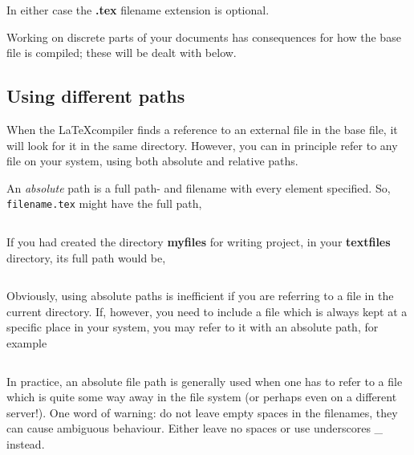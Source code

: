 In either case the \textbf{.tex} filename extension is optional.

Working on discrete parts of your documents has consequences for how the base file is compiled; these will be dealt with below.

\subsection{Using different paths}
When the \LaTeX{}compiler finds a reference to an external file in the base file, it will look for it in the same directory. However, you can in principle refer to any file on your system, using both absolute and relative paths.

An \textit{absolute} path is a full path- and filename with every element specified. So, \lstinline[language={[LaTeX]TeX}]|filename.tex| might have the full path,

\begin{lstlisting}[language={[LaTeX]TeX}]

\end{lstlisting}

If you had created the directory \textbf{myfiles} for writing project, in your \textbf{textfiles} directory, its full path would be,

\begin{lstlisting}[language={[LaTeX]TeX}]

\end{lstlisting}

Obviously, using absolute paths is inefficient if you are referring to a file in the current directory. If, however, you need to include a file which is always kept at a specific place in your system, you may refer to it with an absolute path, for example 

\begin{lstlisting}[language={[LaTeX]TeX}]

\end{lstlisting}

In practice, an absolute file path is generally used when one has to refer to a file which is quite some way away in the file system (or perhaps even on a different server!). One word of warning: do not leave empty spaces in the filenames, they can cause ambiguous behaviour. Either leave no spaces or use underscores \_ instead.

